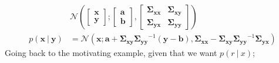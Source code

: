 \documentclass[a4paper, 12pt]{article}
\newcommand{\mat}[1]{\boldsymbol{#1}}
\renewcommand{\vec}[1]{\boldsymbol{#1}}
\begin{document}
                \begin{align*}
                    & \mathcal{N}\left(\begin{bmatrix}
                        \vec{x} \\ \vec{y}
                    \end{bmatrix}; \begin{bmatrix}
                        \vec{a} \\ \vec{b}
                    \end{bmatrix}, \begin{bmatrix}
                        \mat{\Sigma_{xx}} & \mat{\Sigma_{xy}} \\
                        \mat{\Sigma_{yx}} & \mat{\Sigma_{yy}}
                    \end{bmatrix}\right) \\
                    p(\vec{x}\ |\ \vec{y}) & = \mathcal{N}(\vec{x}; \vec{a} + \mat{\Sigma_{xy}}\mat{\Sigma_{yy}}^{-1}(\vec{y} - \vec{b}), \mat{\Sigma_{xx}} - \mat{\Sigma_{xy}}\mat{\Sigma_{yy}}^{-1}\mat{\Sigma_{yx}})
                \end{align*}
                Going back to the motivating example, given that we want $p(r\ |\ x)$;
                \setcounter{equation}{0}
\end{document}
